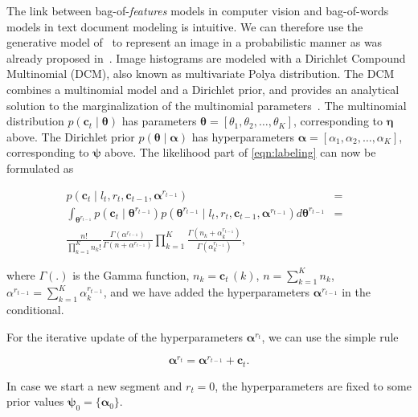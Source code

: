 The link between bag-of-\emph{features} models in computer vision and
bag-of-words models in text document modeling is intuitive. We can therefore use
the generative model of~\cite{madsen05modeling} to represent an image in a
probabilistic manner as was already proposed in~\cite{ranganathan09bayesian}.
Image histograms are modeled with a Dirichlet Compound Multinomial (DCM), also
known as multivariate Polya distribution. The DCM combines a multinomial model
and a Dirichlet prior, and provides an analytical solution to the
marginalization of the multinomial parameters~\cite{minka03estimating}. The
multinomial distribution $p(\mathbf{c}_t\mid\boldsymbol{\theta})$ has parameters
$\boldsymbol{\theta}=[\theta_1,\theta_2,\dots,\theta_K]$, corresponding to
$\boldsymbol{\eta}$ above. The Dirichlet prior
$p(\boldsymbol{\theta}\mid\boldsymbol{\alpha})$ has
hyperparameters $\boldsymbol{\alpha}=[\alpha_1,\alpha_2,\dots,\alpha_K]$,
corresponding to $\boldsymbol{\psi}$ above. The likelihood part of
\eqref{eqn:labeling} can now be formulated as

\begin{eqnarray}
\label{eqn:polya}
p(\mathbf{c}_t\mid l_t,r_t,\mathbf{c}_{t-1},\boldsymbol{\alpha}^{r_{t-1}})
&=&\nonumber\\
\int_{\boldsymbol{\theta}^{r_{t-1}}}
p(\mathbf{c}_{t}\mid\boldsymbol{\theta}^{r_{t-1}})
p(\boldsymbol{\theta}^{r_{t-1}}\mid
l_t,r_t,\mathbf{c}_{t-1},\boldsymbol{\alpha}^{r_{t-1}})
d\boldsymbol{\theta}^{r_{t-1}}
&=&\nonumber\\\frac{n!}{\prod_{k=1}^K n_k!}\frac{\Gamma(\alpha^{r_{t-1}})}
{\Gamma(n+\alpha^{r_{t-1}})}\prod_{k=1}^K\frac{\Gamma(n_k+\alpha^{r_{t-1}}_k)}
{\Gamma(\alpha^{r_{t-1}}_k)},
\end{eqnarray}

where $\Gamma(.)$ is the Gamma function, $n_k=\mathbf{c}_t\,(k)$,
$n=\sum_{k=1}^K n_k$,
$\alpha^{r_{t-1}}=\sum_{k=1}^K\alpha^{r_{t-1}}_k$, and we have added the
hyperparameters $\boldsymbol{\alpha}^{r_{t-1}}$ in the conditional.

For the iterative update of the hyperparameters $\boldsymbol{\alpha}^{r_t}$, we
can use the simple rule

\begin{equation}
\label{eqn:alpha_update}
\boldsymbol{\alpha}^{r_t} = \boldsymbol{\alpha}^{r_{t-1}} + \mathbf{c}_{t}.
\end{equation}

In case we start a new segment and $r_t=0$, the hyperparameters are fixed to
some prior values $\boldsymbol{\psi}_0=\{\boldsymbol{\alpha}_0\}$.

